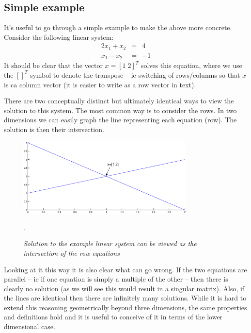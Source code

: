 \documentclass[11pt]{article}
\begin{document}
 \subsection{Simple example}
 It's useful to go through a simple example to make the above more concrete. Consider the following linear system:
  \\
\begin{eqnarray}
2x_1 + x_2 &=& 4 \\ 
x_1 - x_2 &=& -1 \nonumber
 \end{eqnarray}
It should be clear that the vector $x = [1\; 2]^T$ solves this equation, where we use the $[]^T$ symbol to denote the transpose -- ie
switching of rows/columns so that $x$ is ca column vector (it is easier to write as a row vector in text).

There are two conceptually distinct but ultimately identical ways to view the solution to this system. The most common way is to consider
the rows. In two dimensions we can easily graph the line representing each equation (row). The solution is then their intersection.
\begin{figure}[h!]
 \begin{center}
 \includegraphics[width=3.5in]{fig1.eps}
\end{center}
\caption{\small {\it Solution to the example linear system can be viewed as the intersection of the row equations}}.
\label{fig:comm-time}
\end{figure}
Looking at it this way it is also clear what can go wrong. If the two equations are parallel -- ie if one equation is simply a multiple of the other -- then there is clearly no solution (as we will
see this would result in a singular matrix). Also, if the lines are identical then there are infinitely many solutions. While it is hard to extend this reasoning geometrically beyond three dimensions,
the same properties and definitions hold and it is useful to conceive of it in terms of the lower dimensional case.
\end{document}
